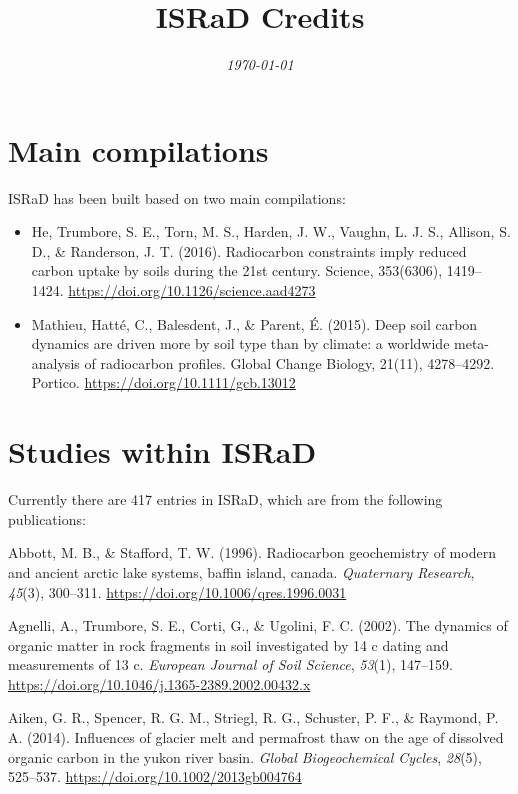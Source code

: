 \documentclass[]{article}
\title{ISRaD Credits}
\author{}
\date{\vspace{-2.5em}\textit{\today}}
\providecommand{\tightlist}{%
  \setlength{\itemsep}{0pt}\setlength{\parskip}{0pt}}
\begin{document}
\maketitle

\hypertarget{main-compilations}{%
\section{Main compilations}\label{main-compilations}}

ISRaD has been built based on two main compilations:

\begin{itemize}
\tightlist
\item
  He, Trumbore, S. E., Torn, M. S., Harden, J. W., Vaughn, L. J. S.,
  Allison, S. D., \& Randerson, J. T. (2016). Radiocarbon constraints
  imply reduced carbon uptake by soils during the 21st century. Science,
  353(6306), 1419--1424. \url{https://doi.org/10.1126/science.aad4273}
\item
  Mathieu, Hatté, C., Balesdent, J., \& Parent, É. (2015). Deep soil
  carbon dynamics are driven more by soil type than by climate: a
  worldwide meta-analysis of radiocarbon profiles. Global Change
  Biology, 21(11), 4278--4292. Portico.
  \url{https://doi.org/10.1111/gcb.13012}
\end{itemize}

\hypertarget{studies-within-israd}{%
\section{Studies within ISRaD}\label{studies-within-israd}}

Currently there are 417 entries in ISRaD, which are from the following
publications:

\hypertarget{refs}{}
\leavevmode\hypertarget{ref-Abbott_1996}{}%
Abbott, M. B., \& Stafford, T. W. (1996). Radiocarbon geochemistry of
modern and ancient arctic lake systems, baffin island, canada.
\emph{Quaternary Research}, \emph{45}(3), 300--311.
\url{https://doi.org/10.1006/qres.1996.0031}

\leavevmode\hypertarget{ref-Agnelli_2002}{}%
Agnelli, A., Trumbore, S. E., Corti, G., \& Ugolini, F. C. (2002). The
dynamics of organic matter in rock fragments in soil investigated by 14
c dating and measurements of 13 c. \emph{European Journal of Soil
Science}, \emph{53}(1), 147--159.
\url{https://doi.org/10.1046/j.1365-2389.2002.00432.x}

\leavevmode\hypertarget{ref-Aiken_2014}{}%
Aiken, G. R., Spencer, R. G. M., Striegl, R. G., Schuster, P. F., \&
Raymond, P. A. (2014). Influences of glacier melt and permafrost thaw on
the age of dissolved organic carbon in the yukon river basin.
\emph{Global Biogeochemical Cycles}, \emph{28}(5), 525--537.
\url{https://doi.org/10.1002/2013gb004764}
\end{document}
